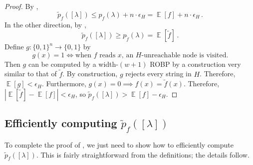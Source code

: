 \documentclass{toc}
\DeclareMathOperator*{\ExpVal}{\mathbb{E}}
\begin{document}
\begin{proof}
By ,
$$
\widetilde{p}_f([\lambda]) \leq p_f(\lambda) + n \cdot \epsilon_H = \ExpVal[f] + n \cdot \epsilon_H\,.
$$
In the other direction, by ,
$$
\widetilde{p}_f([\lambda]) \geq p_{\widetilde{f}}(\lambda) = \ExpVal[\widetilde{f}]\,.
$$
Define $g \colon \{0, 1\}^n \to \{0, 1\}$ by
$$
g(x) = 1 \iff \text{when $f$ reads $x$, an $H$-unreachable node is visited}.
$$
Then $g$ can be computed by a width-$(w + 1)$ ROBP by a construction very similar to that of $\widetilde{f}$. By construction, $g$ rejects every string in $H$. Therefore, $\ExpVal[g] < \epsilon_H$. Furthermore, $g(x) = 0 \implies f(x) = \widetilde{f}(x)$. Therefore, $|\ExpVal[\widetilde{f}] - \ExpVal[f]| < \epsilon_H$, so $\widetilde{p}_f([\lambda]) > \ExpVal[f] - \epsilon_H$.
\end{proof}


\subsection{Efficiently computing $\widetilde{p}_f([\lambda])$} \label{sec:const-width-efficiency}

To complete the proof of , we just need to show how to efficiently compute $\widetilde{p}_f([\lambda])$. This is fairly straightforward from the definitions; the details follow.
\end{document}
